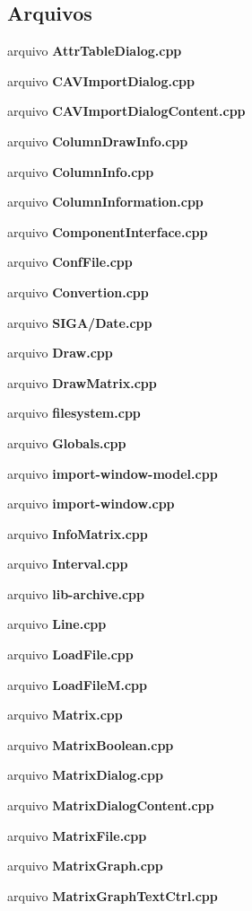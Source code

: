 \subsection*{Arquivos}
\begin{DoxyCompactItemize}
\item 
arquivo {\bf Attr\+Table\+Dialog.\+cpp}
\item 
arquivo {\bf C\+A\+V\+Import\+Dialog.\+cpp}
\item 
arquivo {\bf C\+A\+V\+Import\+Dialog\+Content.\+cpp}
\item 
arquivo {\bf Column\+Draw\+Info.\+cpp}
\item 
arquivo {\bf Column\+Info.\+cpp}
\item 
arquivo {\bf Column\+Information.\+cpp}
\item 
arquivo {\bf Component\+Interface.\+cpp}
\item 
arquivo {\bf Conf\+File.\+cpp}
\item 
arquivo {\bf Convertion.\+cpp}
\item 
arquivo {\bf S\+I\+G\+A/\+Date.\+cpp}
\item 
arquivo {\bf Draw.\+cpp}
\item 
arquivo {\bf Draw\+Matrix.\+cpp}
\item 
arquivo {\bf filesystem.\+cpp}
\item 
arquivo {\bf Globals.\+cpp}
\item 
arquivo {\bf import-\/window-\/model.\+cpp}
\item 
arquivo {\bf import-\/window.\+cpp}
\item 
arquivo {\bf Info\+Matrix.\+cpp}
\item 
arquivo {\bf Interval.\+cpp}
\item 
arquivo {\bf lib-\/archive.\+cpp}
\item 
arquivo {\bf Line.\+cpp}
\item 
arquivo {\bf Load\+File.\+cpp}
\item 
arquivo {\bf Load\+File\+M.\+cpp}
\item 
arquivo {\bf Matrix.\+cpp}
\item 
arquivo {\bf Matrix\+Boolean.\+cpp}
\item 
arquivo {\bf Matrix\+Dialog.\+cpp}
\item 
arquivo {\bf Matrix\+Dialog\+Content.\+cpp}
\item 
arquivo {\bf Matrix\+File.\+cpp}
\item 
arquivo {\bf Matrix\+Graph.\+cpp}
\item 
arquivo {\bf Matrix\+Graph\+Text\+Ctrl.\+cpp}

\end{DoxyCompactItemize}
